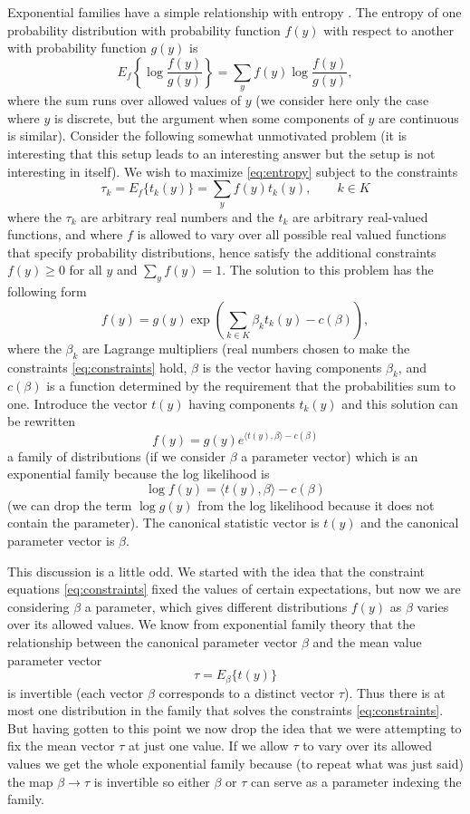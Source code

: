\documentclass[11pt]{article}
\newcommand{\inner}[1]{\langle #1 \rangle}
\begin{document}
Exponential families have a simple relationship with entropy \citep{jaynes}.
The
entropy of one probability distribution with probability function $f(y)$ with
respect to another with probability function $g(y)$ is
\begin{equation} \label{eq:entropy}
   E_f\left\{ \log \frac{f(y)}{g(y)} \right\}
   =
   \sum_y f(y) \log \frac{f(y)}{g(y)},
\end{equation}
where the sum runs over allowed values of $y$ (we consider here only the
case where $y$ is discrete, but the argument when some components of $y$
are continuous is similar).
Consider the following somewhat unmotivated problem (it is interesting that
this setup leads to an interesting answer but the setup is not interesting
in itself).  We wish to maximize \eqref{eq:entropy} subject to the constraints
\begin{equation} \label{eq:constraints}
   \tau_k = E_f\{ t_k(y) \} = \sum_y f(y) t_k(y), \qquad k \in K
\end{equation}
where the $\tau_k$ are arbitrary real numbers and the $t_k$ are arbitrary
real-valued functions, and where $f$ is allowed to vary
over all possible real valued functions that specify
probability distributions, hence satisfy the additional constraints
$f(y) \ge 0$ for all $y$ and $\sum_y f(y) = 1$.  The solution to this problem
has the following form
$$
   f(y) = g(y) \exp\left( \sum_{k \in K} \beta_k t_k(y) - c(\beta) \right),
$$
where the $\beta_k$ are Lagrange multipliers (real numbers chosen
to make the constraints \eqref{eq:constraints} hold, $\beta$ is the vector
having components $\beta_k$, and $c(\beta)$ is a function determined by
the requirement that the probabilities sum to one.
Introduce the vector $t(y)$ having components
$t_k(y)$ and this solution can be rewritten
$$
   f(y) = g(y) e^{\inner{t(y), \beta} - c(\beta)}
$$
a family of distributions (if we consider $\beta$ a parameter vector)
which is an exponential family because the log likelihood is
$$
   \log f(y) = \inner{t(y), \beta} - c(\beta)
$$
(we can drop the term $\log g(y)$ from the log likelihood because it does not
contain the parameter).  The canonical statistic vector is $t(y)$ and the
canonical parameter vector is $\beta$.

This discussion is a little odd.  We started with the idea that the
constraint equations \eqref{eq:constraints} fixed the values of certain
expectations, but now we are considering $\beta$ a parameter, which gives
different distributions $f(y)$ as $\beta$ varies over its allowed values.
We know from exponential family theory that the relationship between
the canonical parameter vector $\beta$ and the mean value parameter vector
$$
   \tau = E_\beta\{ t(y) \}
$$
is invertible (each vector $\beta$ corresponds
to a distinct vector $\tau$).  Thus there is at most one distribution in the
family that solves the constraints \eqref{eq:constraints}.  But having
gotten to this point we now drop the idea that we were attempting to fix
the mean vector $\tau$ at just one value.  If we allow $\tau$ to vary over
its allowed values we get the whole exponential family because (to repeat
what was just said) the map $\beta \to \tau$ is invertible so either $\beta$
or $\tau$ can serve as a parameter indexing the family.
\end{document}
